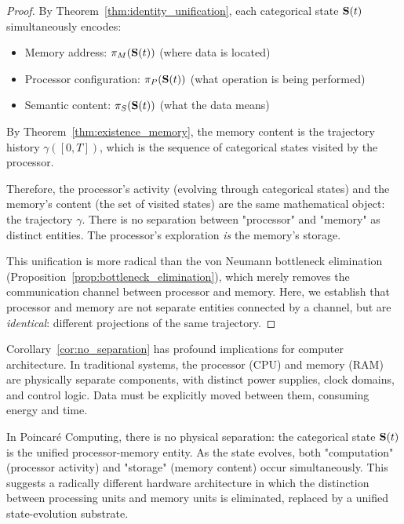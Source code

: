 \begin{proof}
By Theorem~\ref{thm:identity_unification}, each categorical state $\mathbf{S}(t)$ simultaneously encodes:
\begin{itemize}
    \item Memory address: $\pi_M(\mathbf{S}(t))$ (where data is located)
    \item Processor configuration: $\pi_P(\mathbf{S}(t))$ (what operation is being performed)
    \item Semantic content: $\pi_S(\mathbf{S}(t))$ (what the data means)
\end{itemize}

By Theorem~\ref{thm:existence_memory}, the memory content is the trajectory history $\gamma([0, T])$, which is the sequence of categorical states visited by the processor.

Therefore, the processor's activity (evolving through categorical states) and the memory's content (the set of visited states) are the same mathematical object: the trajectory $\gamma$. There is no separation between "processor" and "memory" as distinct entities. The processor's exploration \textit{is} the memory's storage.

This unification is more radical than the von Neumann bottleneck elimination (Proposition~\ref{prop:bottleneck_elimination}), which merely removes the communication channel between processor and memory. Here, we establish that processor and memory are not separate entities connected by a channel, but are \textit{identical}: different projections of the same trajectory.
\end{proof}

\begin{remark}
\label{rem:architecture_implications}
Corollary~\ref{cor:no_separation} has profound implications for computer architecture. In traditional systems, the processor (CPU) and memory (RAM) are physically separate components, with distinct power supplies, clock domains, and control logic. Data must be explicitly moved between them, consuming energy and time.

In Poincaré Computing, there is no physical separation: the categorical state $\mathbf{S}(t)$ is the unified processor-memory entity. As the state evolves, both "computation" (processor activity) and "storage" (memory content) occur simultaneously. This suggests a radically different hardware architecture in which the distinction between processing units and memory units is eliminated, replaced by a unified state-evolution substrate.
\end{remark}

